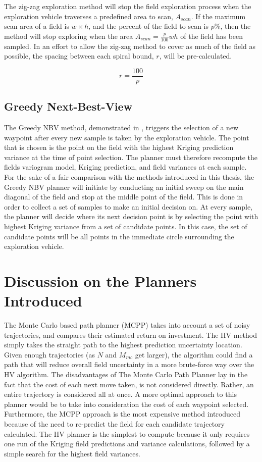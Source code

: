 The zig-zag exploration method will stop the field exploration process when the exploration vehicle traverses a predefined area to scan, $A_{scan}$. If the maximum scan area of a field is $w \times h$, and the percent of the field to scan is $p\%$, then the method will stop exploring when the area $A_{scan} = \frac{p}{100}wh$ of the field has been sampled. In an effort to allow the zig-zag method to cover as much of the field as possible, the spacing between each spiral bound, $r$, will be pre-calculated.

\begin{equation}
    r = \frac{100}{p}
\end{equation}

\subsection{Greedy Next-Best-View}
The Greedy NBV method, demonstrated in \cite{fentanes:soilkrig}, triggers the selection of a new waypoint after every new sample is taken by the exploration vehicle. The point that is chosen is the point on the field with the highest Kriging prediction variance at the time of point selection. The planner must therefore recompute the fields variogram model, Kriging prediction, and field variances at each sample. For the sake of a fair comparison with the methods introduced in this thesis, the Greedy NBV planner will initiate by conducting an initial sweep on the main diagonal of the field and stop at the middle point of the field. This is done in order to collect a set of samples to make an initial decision on. At every sample, the planner will decide where its next decision point is by selecting the point with highest Kriging variance from a set of candidate points. In this case, the set of candidate points will be all points in the immediate circle surrounding the exploration vehicle.

\section{Discussion on the Planners Introduced}
The Monte Carlo based path planner (MCPP) takes into account a set of noisy trajectories, and compares their estimated return on investment. The HV method simply takes the straight path to the highest prediction uncertainty location. Given enough trajectories (as $N$ and $M_{mc}$ get larger), the algorithm could find a path that will reduce overall field uncertainty in a more brute-force way over the HV algorithm. The disadvantages of The Monte Carlo Path Planner lay in the fact that the cost of each next move taken, is not considered directly. Rather, an entire trajectory is considered all at once. A more optimal approach to this planner would be to take into consideration the cost of each waypoint selected. Furthermore, the MCPP approach is the most expensive method introduced because of the need to re-predict the field for each candidate trajectory calculated. The HV planner is the simplest to compute because it only requires one run of the Kriging field predictions and variance calculations, followed by a simple search for the highest field variances.

